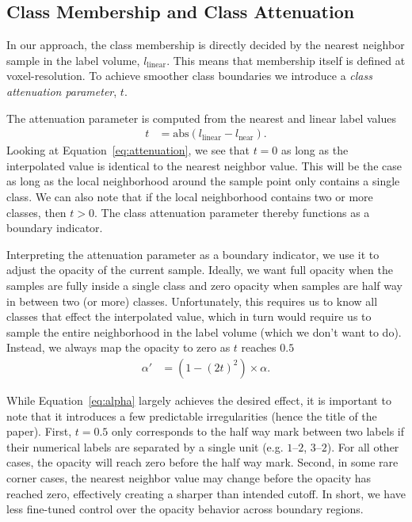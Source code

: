 \documentclass{egpubl}
\begin{document}
\subsection*{Class Membership and Class Attenuation}

In our approach, the class membership is directly decided by the nearest neighbor sample in the label volume, $l_\mathrm{linear}$. This means that membership itself is defined at voxel-resolution. To achieve smoother class boundaries we introduce a \emph{class attenuation parameter}, $t$.

The attenuation parameter is computed from the nearest and linear label values
\begin{align}
t &= \mathrm{abs}(l_\mathrm{linear} - l_\mathrm{near})  .  \label{eq:attenuation}
\end{align}
Looking at Equation~\ref{eq:attenuation}, we see that $t=0$ as long as the interpolated value is identical to the nearest neighbor value. This will be the case as long as the local neighborhood around the sample point only contains a single class. We can also note that if the local neighborhood contains two or more classes, then $t > 0$. The class attenuation parameter thereby functions as a boundary indicator.

Interpreting the attenuation parameter as a boundary indicator, we use it to adjust the opacity of the current sample. Ideally, we want full opacity when the samples are fully inside a single class and zero opacity when samples are half way in between two (or more) classes. Unfortunately, this requires us to know all classes that effect the interpolated value, which in turn would require us to sample the entire neighborhood in the label volume (which we don't want to do). Instead, we always map the opacity to zero as $t$ reaches $0.5$ 
\begin{align}
\alpha' &= (1-(2t)^2) \times \alpha  .  \label{eq:alpha}
\end{align}

While Equation~\ref{eq:alpha} largely achieves the desired effect, it is important to note that it introduces a few predictable irregularities (hence the title of the paper). First, $t=0.5$ only corresponds to the half way mark between two labels if their numerical labels are separated by a single unit (e.g. $1$--$2$, $3$--$2$). For all other cases, the opacity will reach zero before the half way mark. Second, in some rare corner cases, the nearest neighbor value may change before the opacity has reached zero, effectively creating a sharper than intended cutoff. In short, we have less fine-tuned control over the opacity behavior across boundary regions. 
\end{document}
